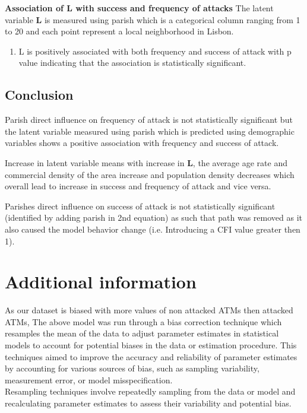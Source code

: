 \documentclass[10pt, conference, compsocconf]{IEEEtran}
\begin{document}
\textbf{Association of L with success and frequency of attacks}
The latent variable \textbf{L} is measured using parish which is a categorical column ranging from 1 to 20 and each point represent a local neighborhood in Lisbon.

\begin{enumerate}
	\item L is positively associated with both frequency and success of attack with p value indicating that the association is statistically significant.
\end{enumerate}


\subsection{Conclusion}

Parish direct influence on frequency of attack is not statistically significant but the latent variable measured using parish which is predicted using demographic variables  shows a positive association with frequency and success of attack.

Increase in latent variable means with increase in \textbf{L}, the average age rate and commercial density of the area increase and population density decreases which overall lead to  increase in success and frequency of attack and vice versa.



Parishes direct influence on success of attack is not statistically significant (identified by adding parish in 2nd equation) as such that path was removed as it also caused the model behavior change (i.e. Introducing a CFI value greater then 1).

\section{Additional information}
As our dataset is biased with more values of non attacked ATMs then attacked ATMs,
The above model was run through a bias correction technique which resamples the mean of the data to adjust parameter estimates in statistical models to account for potential biases in the data or estimation procedure. This techniques aimed to improve the accuracy and reliability of parameter estimates by accounting for various sources of bias, such as sampling variability, measurement error, or model misspecification.\\
Resampling techniques involve repeatedly sampling from the data or model and recalculating parameter estimates to assess their variability and potential bias.
\end{document}
